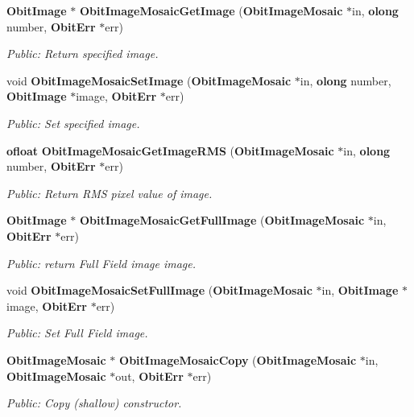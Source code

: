\begin{CompactItemize}
{\bf Obit\-Image} $\ast$ {\bf Obit\-Image\-Mosaic\-Get\-Image} ({\bf Obit\-Image\-Mosaic} $\ast$in, {\bf olong} number, {\bf Obit\-Err} $\ast$err)
\begin{CompactList}\small\item\em Public: Return specified image. \item\end{CompactList}\item 
void {\bf Obit\-Image\-Mosaic\-Set\-Image} ({\bf Obit\-Image\-Mosaic} $\ast$in, {\bf olong} number, {\bf Obit\-Image} $\ast$image, {\bf Obit\-Err} $\ast$err)
\begin{CompactList}\small\item\em Public: Set specified image. \item\end{CompactList}\item 
{\bf ofloat} {\bf Obit\-Image\-Mosaic\-Get\-Image\-RMS} ({\bf Obit\-Image\-Mosaic} $\ast$in, {\bf olong} number, {\bf Obit\-Err} $\ast$err)
\begin{CompactList}\small\item\em Public: Return RMS pixel value of image. \item\end{CompactList}\item 
{\bf Obit\-Image} $\ast$ {\bf Obit\-Image\-Mosaic\-Get\-Full\-Image} ({\bf Obit\-Image\-Mosaic} $\ast$in, {\bf Obit\-Err} $\ast$err)
\begin{CompactList}\small\item\em Public: return Full Field image image. \item\end{CompactList}\item 
void {\bf Obit\-Image\-Mosaic\-Set\-Full\-Image} ({\bf Obit\-Image\-Mosaic} $\ast$in, {\bf Obit\-Image} $\ast$image, {\bf Obit\-Err} $\ast$err)
\begin{CompactList}\small\item\em Public: Set Full Field image. \item\end{CompactList}\item 
{\bf Obit\-Image\-Mosaic} $\ast$ {\bf Obit\-Image\-Mosaic\-Copy} ({\bf Obit\-Image\-Mosaic} $\ast$in, {\bf Obit\-Image\-Mosaic} $\ast$out, {\bf Obit\-Err} $\ast$err)
\begin{CompactList}\small\item\em Public: Copy (shallow) constructor. \item\end{CompactList}\item 

\end{CompactItemize}
